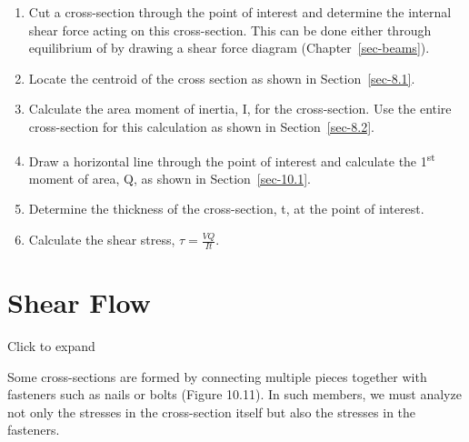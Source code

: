 \documentclass[
  letterpaper,
  DIV=11,
  numbers=noendperiod]{scrreprt}
\providecommand{\tightlist}{%
  \setlength{\itemsep}{0pt}\setlength{\parskip}{0pt}}\usepackage{longtable,booktabs,array}
\theoremstyle{definition}
\theoremstyle{remark}
\begin{document}
\begin{tcolorbox}[enhanced jigsaw, leftrule=.75mm, colbacktitle=quarto-callout-warning-color!10!white, breakable, opacityback=0, colback=white, titlerule=0mm, toprule=.15mm, colframe=quarto-callout-warning-color-frame, coltitle=black, title={Step-by-step: Shear stress}, toptitle=1mm, bottomrule=.15mm, rightrule=.15mm, left=2mm, arc=.35mm, opacitybacktitle=0.6, bottomtitle=1mm]

\begin{enumerate}
\def\labelenumi{\arabic{enumi}.}
\tightlist
\item
  Cut a cross-section through the point of interest and determine the
  internal shear force acting on this cross-section. This can be done
  either through equilibrium of by drawing a shear force diagram
  (Chapter~\ref{sec-beams}).
\item
  Locate the centroid of the cross section as shown in
  Section~\ref{sec-8.1}.
\item
  Calculate the area moment of inertia, I, for the cross-section. Use
  the entire cross-section for this calculation as shown in
  Section~\ref{sec-8.2}.
\item
  Draw a horizontal line through the point of interest and calculate the
  1\textsuperscript{st} moment of area, Q, as shown in
  Section~\ref{sec-10.1}.
\item
  Determine the thickness of the cross-section, t, at the point of
  interest.
\item
  Calculate the shear stress, \(\tau=\frac{VQ}{It}\).
\end{enumerate}

\end{tcolorbox}

\section{Shear Flow}\label{sec-10.3}

Click to expand

Some cross-sections are formed by connecting multiple pieces together
with fasteners such as nails or bolts (Figure 10.11). In such members,
we must analyze not only the stresses in the cross-section itself but
also the stresses in the fasteners.
\end{document}
